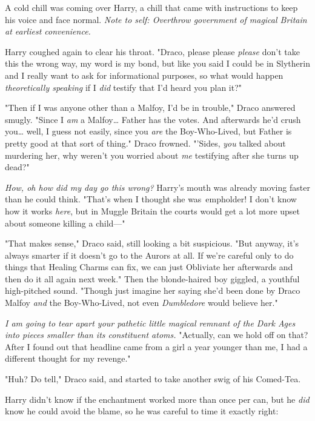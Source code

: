 A cold chill was coming over Harry, a chill that came with instructions to keep 
his voice and face normal. \emph{Note to self: Overthrow government of magical 
Britain at earliest convenience.}

Harry coughed again to clear his throat. "Draco, please please \emph{please} 
don't take this the wrong way, my word is my bond, but like you said I could be 
in Slytherin and I really want to ask for informational purposes, so what would 
happen \emph{theoretically speaking} if I \emph{did} testify that I'd heard you 
plan it?"

"Then if I was anyone other than a Malfoy, I'd be in trouble," Draco answered 
smugly. "Since I \emph{am} a Malfoy{\ldots} Father has the votes. And 
afterwards he'd crush you{\ldots} well, I guess not easily, since you 
\emph{are} the Boy-Who-Lived, but Father is pretty good at that sort of thing." 
Draco frowned. "'Sides, \emph{you} talked about murdering her, why weren't you 
worried about \emph{me} testifying after she turns up dead?"

\emph{How, oh how did my day go this wrong?} Harry's mouth was already moving 
faster than he could think. "That's when I thought she was\ emph{older!} I 
don't know how it works \emph{here}, but in Muggle Britain the courts would get 
a lot more upset about someone killing a child---"

"That makes sense," Draco said, still looking a bit suspicious. "But anyway, 
it's always smarter if it doesn't go to the Aurors at all. If we're careful 
only to do things that Healing Charms can fix, we can just Obliviate her 
afterwards and then do it all again next week." Then the blonde-haired boy 
giggled, a youthful high-pitched sound. "Though just imagine her saying she'd 
been done by Draco Malfoy \emph{and} the Boy-Who-Lived, not even 
\emph{Dumbledore} would believe her."

\emph{I am going to tear apart your pathetic little magical remnant of the Dark 
Ages into pieces smaller than its constituent atoms.} "Actually, can we hold 
off on that? After I found out that headline came from a girl a year younger 
than me, I had a different thought for my revenge."

"Huh? Do tell," Draco said, and started to take another swig of his Comed-Tea.

Harry didn't know if the enchantment worked more than once per can, but he 
\emph{did} know he could avoid the blame, so he was careful to time it exactly 
right:

